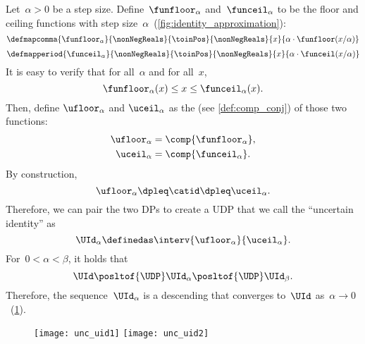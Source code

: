 Let~$\alpha>0$ be a step size.
Define~$\funfloor_{\alpha}$ and~$\funceil_{\alpha}$ to be the floor and ceiling functions with step size~$\alpha$~(\cref{fig:identity_approximation}):
\begin{equation}
    \defmapcomma{
        \funfloor_{\alpha}
    }{
        \nonNegReals
    }{
        \toinPos
    }{
        \nonNegReals
    }{
        x
    }{
        \alpha \cdot \funfloor(x/\alpha)
    }
\end{equation}
\begin{equation}
    \defmapperiod{
        \funceil_{\alpha}
    }{
        \nonNegReals
    }{
        \toinPos
    }{
        \nonNegReals
    }{
        x
    }{
        \alpha \cdot \funceil(x/\alpha)
    }
\end{equation}
It is easy to verify that for all~$\alpha$ and for all~$x$,
\begin{equation}
    \funfloor_{\alpha}(x) \leq x \leq \funceil_{\alpha}(x).
\end{equation}
Then, define $\ufloor_{\alpha}$ and $\uceil_\alpha$ as the  (see \cref{def:comp_conj}) of those two functions:
\begin{align}
    \ufloor_{\alpha} & = \comp{\funfloor_\alpha}, \\
    \uceil_{\alpha}  & = \comp{\funceil_\alpha} .
\end{align}
By construction,
\begin{equation}
    \ufloor_{\alpha}\dpleq\catid\dpleq\uceil_{\alpha}.
\end{equation}
Therefore, we can pair the two DPs to create a UDP that we call the ``uncertain identity'' as
\begin{equation}
    \UId_{\alpha}\definedas \interv {\ufloor_{\alpha}} {\uceil_{\alpha}}.
\end{equation}
For~$0<\alpha<\beta$, it holds that
%
\begin{equation}
    \UId\posltof{\UDP}\UId_{\alpha}\posltof{\UDP}\UId_{\beta}.
\end{equation}
%
Therefore, the sequence~$\UId_{\alpha}$ is a descending  that converges to~$\UId$ as~$\alpha\to0$~(\cref{fig:other}).

\begin{figure}[b]
    \hfill
    \texttt{[image: unc\_uid1]}
    \hfill
    \texttt{[image: unc\_uid2]}
    \hfill
    \caption{}
    \label{fig:other}
\end{figure}

